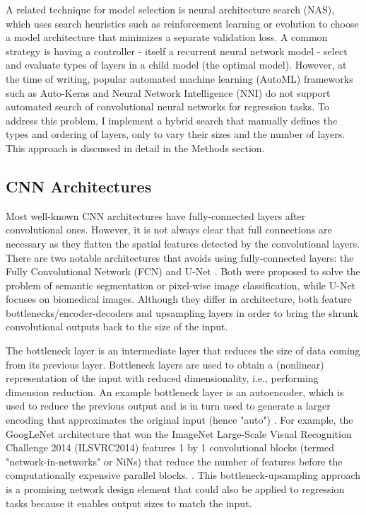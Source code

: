       A related technique for model selection is neural architecture search (NAS), which uses search heuristics such as reinforcement learning \cite{zoph2016neural, pham2018efficient} or evolution \cite{real2017large} to choose a model architecture that minimizes a separate validation loss. A common strategy is having a controller - itself a recurrent neural network model - select and evaluate types of layers in a child model (the optimal model). However, at the time of writing, popular automated machine learning (AutoML) frameworks such as Auto-Keras \cite{jin2019auto} and Neural Network Intelligence (NNI) do not support automated search of convolutional neural networks for regression tasks. To address this problem, I implement a hybrid search that manually defines the types and ordering of layers, only to vary their sizes and the number of layers. This approach is discussed in detail in the Methods section.

    \subsection{CNN Architectures}
      Most well-known CNN architectures have fully-connected layers after convolutional ones. However, it is not always clear that full connections are necessary as they flatten the spatial features detected by the convolutional layers. There are two notable architectures that avoids using fully-connected layers: the Fully Convolutional Network (FCN) \cite{long2015fcn} and U-Net \cite{ronneberger2015unet}. Both were proposed to solve the problem of semantic segmentation or pixel-wise image classification, while U-Net focuses on biomedical images. Although they differ in architecture, both feature bottlenecks/encoder-decoders and upsampling layers in order to bring the shrunk convolutional outputs back to the size of the input.

      The bottleneck layer is an intermediate layer that reduces the size of data coming from its previous layer. Bottleneck layers are used to obtain a (nonlinear) representation of the input with reduced dimensionality, i.e., performing dimension reduction. An example bottleneck layer is an autoencoder, which is used to reduce the previous output and is in turn used to generate a larger encoding that approximates the original input (hence "auto") \cite{ballard1987modular}. For example, the GoogLeNet architecture that won the ImageNet Large-Scale Visual Recognition Challenge 2014 (ILSVRC2014) features 1 by 1 convolutional blocks (termed "network-in-networks" or NiNs) that reduce the number of features before the computationally expensive parallel blocks. \cite{szegedy2015going}. This bottleneck-upsampling approach is a promising network design element that could also be applied to regression tasks because it enables output sizes to match the input.

